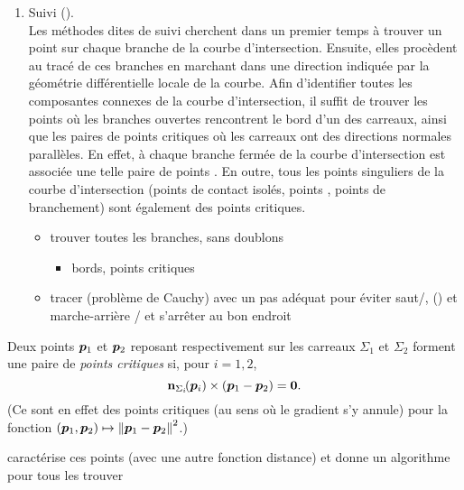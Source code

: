 \begin{enumerate}
	\item Suivi ().\\
	Les méthodes dites de suivi cherchent dans un premier temps à trouver un point sur chaque branche de la courbe d'intersection. 
	Ensuite, elles procèdent au tracé de ces branches en marchant dans une direction indiquée par la géométrie différentielle locale de la courbe. 
	Afin d'identifier toutes les composantes connexes de la courbe d'intersection, il suffit de trouver les points où les branches ouvertes rencontrent le bord d'un des carreaux, ainsi que les paires de points critiques où les carreaux ont des directions normales parallèles.
	En effet, à chaque branche fermée de la courbe d'intersection est associée une telle paire de points \cite{sederberg1989}.
	En outre, tous les points singuliers de la courbe d'intersection (points de contact isolés, points , points de branchement) sont également des points critiques.
	\begin{itemize}
		\item trouver toutes les branches, sans doublons
		\begin{itemize}
			\item bords, points critiques
		\end{itemize}
		\item tracer (problème de Cauchy) avec un pas adéquat pour éviter saut/, () et marche-arrière / et s'arrêter au bon endroit
	\end{itemize}
\end{enumerate}
%

\par\bigskip

\begin{definition}
	Deux points $\bm{p}_1$ et $\bm{p}_2$ reposant respectivement sur les carreaux $\Sigma_1$ et $\Sigma_2$ forment une paire de \emph{points critiques} si, pour $i = 1,2$,
	\begin{equation}
		{ \mathbf{n}_{\Sigma_i}\!(\bm{p}_i) } \times {(\bm{p}_1 - \bm{p}_2)} = \bm{0}.
	\end{equation}
	(Ce sont en effet des points critiques (au sens où le gradient s'y annule) pour la fonction $(\bm{p}_1, \bm{p}_2) \mapsto \left\| {\bm{p}_1 - \bm{p}_2} \right\|^2$.)
\end{definition}
\cite{yamaguchi1998} caractérise ces points (avec une autre fonction distance) et donne un algorithme pour tous les trouver




